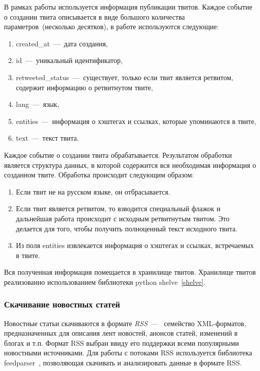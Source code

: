         В рамках работы используется информация публикации твитов.
        Каждое событие о создании твита описывается в виде большого количества параметров~(несколько десятков), в работе используются следующие:
        \begin{enumerate}
            \item created\_at~---~дата создания,
            \item id~---~уникальный идентификатор,
            \item retweeted\_status~---~существует, только если твит является ретвитом, содержит информацию о ретвитнутом твите,
            \item lang~---~язык,
            \item entities~---~информация о хэштегах и ссылках, которые упоминаются  в твите,
            \item text~---~текст твита.
        \end{enumerate}

        Каждое событие о создании твита обрабатывается.
        Результатом обработки является структура данных, в которой содержится вся необходимая информация о созданном твите.
        Обработка происходит следующим образом:
        \begin{enumerate}
            \item Если твит не на русском языке, он отбрасывается.
            \item Если твит является ретвитом, то взводится специальный флажок и дальнейшая работа происходит с исходным ретвитнутым твитом.
            Это делается для того, чтобы получить полноценный текст исходного твита.
            \item Из поля entities извлекается информация о хэштегах и ссылках, встречаемых в твите.
        \end{enumerate}
        Вся полученная информация помещается в хранилище твитов. Хранилище твитов реализованно использованием библиотеки python shelve~\ref{shelve}.

    \subsubsection{Скачивание новостных статей}
        Новостные статьи скачиваются в формате
        \textit{RSS}~---~ семейство XML-форматов, предназначенных для описания лент новостей, анонсов статей, изменений в блогах и т.п.
        Формат RSS выбран ввиду его поддержки всеми популярными новостными источниками.
        Для работы с потоками RSS используется библиотека feedparser~\cite{feedparser}, позволяющая скачивать и анализировать данные в формате RSS.

